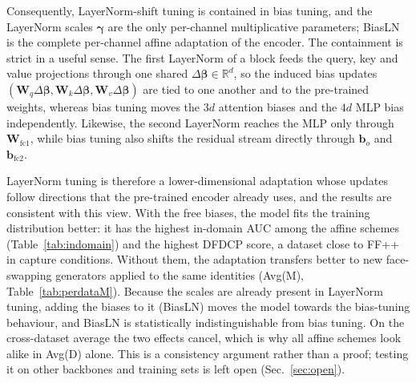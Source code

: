\documentclass[fonts]{icst}
\begin{document}
Consequently, LayerNorm-shift tuning is contained in bias tuning, and the LayerNorm scales $\boldsymbol{\gamma}$ are the only per-channel multiplicative parameters; BiasLN is the complete per-channel affine adaptation of the encoder. The containment is strict in a useful sense. The first LayerNorm of a block feeds the query, key and value projections through one shared $\Delta\boldsymbol{\beta}\in\mathbb{R}^{d}$, so the induced bias updates $(\mathbf{W}_q\Delta\boldsymbol{\beta},\mathbf{W}_k\Delta\boldsymbol{\beta},\mathbf{W}_v\Delta\boldsymbol{\beta})$ are tied to one another and to the pre-trained weights, whereas bias tuning moves the $3d$ attention biases and the $4d$ MLP bias independently. Likewise, the second LayerNorm reaches the MLP only through $\mathbf{W}_{\mathrm{fc1}}$, while bias tuning also shifts the residual stream directly through $\mathbf{b}_o$ and $\mathbf{b}_{\mathrm{fc2}}$.

LayerNorm tuning is therefore a lower-dimensional adaptation whose updates follow directions that the pre-trained encoder already uses, and the results are consistent with this view. With the free biases, the model fits the training distribution better: it has the highest in-domain AUC among the affine schemes (Table~\ref{tab:indomain}) and the highest DFDCP score, a dataset close to FF++ in capture conditions. Without them, the adaptation transfers better to new face-swapping generators applied to the same identities (Avg(M), Table~\ref{tab:perdataM}). Because the scales are already present in LayerNorm tuning, adding the biases to it (BiasLN) moves the model towards the bias-tuning behaviour, and BiasLN is statistically indistinguishable from bias tuning. On the cross-dataset average the two effects cancel, which is why all affine schemes look alike in Avg(D) alone. This is a consistency argument rather than a proof; testing it on other backbones and training sets is left open (Sec.~\ref{sec:open}).

\end{document}
